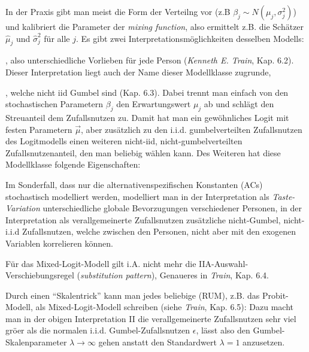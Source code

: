 %
In der Praxis gibt
man meist die Form der Verteilng vor (z.B $\beta_j \sim N(\mu_j,
\sigma_j^2)$) und kalibriert die Parameter der \emph{mixing function}, also
ermittelt z.B. die Sch\"atzer $\hat{\mu}_j$ und $\hat{\sigma}_j^2$
f\"ur alle $j$. 
Es gibt zwei Interpretationsm\"oglichkeiten desselben Modells:
\bi
\item [I] , also unterschiedliche Vorlieben f\"ur
  jede Person (\emph{Kenneth E. Train}, Kap. 6.2). Dieser
  Interpretation liegt auch der Name  dieser
  Modellklasse zugrunde,
\item [II] , welche nicht iid Gumbel sind
(Kap. 6.3). Dabei trennt man einfach von den stochastischen Parametern $\beta_j$
den Erwartungs\-wert $\mu_j$ ab und schl\"agt den Streuanteil dem Zufalls\-nutzen
zu. Damit hat man ein gew\"ohnliches Logit mit festen Parametern
$\vec{\mu}$, aber zus\"atzlich zu den
i.i.d. gum\-belverteilten Zufalls\-nutzen des Logitmodells einen weiteren
nicht-iid, nicht-gum\-bel\-ver\-teil\-ten Zufalls\-nutzen\-anteil, den man
beliebig w\"ahlen kann.
\ei
Des Weiteren hat diese Modellklasse folgende Eigenschaften:

\bi
\item Im Sonderfall, dass nur die alternativenspezifischen Konstanten
  (ACs) stochastisch modelliert werden, modelliert man in der
Interpretation als \emph{Taste-Variation} unterschiedliche globale Bevorzugungen
verschiedener Personen, in der Interpretation als verallgemeinerte
Zufallsnutzen zus\"atzliche 
nicht-Gumbel, nicht-i.i.d  Zufallsnutzen, welche zwischen den
Personen, nicht aber  mit den  exogenen Variablen
korrelieren k\"onnen.

\item F\"ur das Mixed-Logit-Modell gilt i.A. nicht mehr die
  IIA-Auswahl-Verschiebungs\-regel (\emph{substitution pattern}),
  Genaueres in \emph{Train}, Kap. 6.4.

\item Durch einen ``Skalentrick'' kann man
  jedes beliebige  
  (RUM), z.B. das Probit-Modell, als Mixed-Logit-Modell schreiben
  (siehe \emph{Train}, Kap. 6.5): Dazu macht man in der obigen
  Interpretation II 
  die verallgemeinerte Zufallsnutzen sehr viel gr\"o\3er als die
  normalen i.i.d. Gumbel-Zufallsnutzen
  $\epsilon$, l\"asst also den Gumbel-Skalenparameter  $\lambda\to \infty$
  gehen anstatt den Standardwert $\lambda=1$ anzusetzen. 

